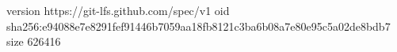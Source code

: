 version https://git-lfs.github.com/spec/v1
oid sha256:e94088e7e8291fef91446b7059aa18fb8121c3ba6b08a7e80e95c5a02de8bdb7
size 626416
